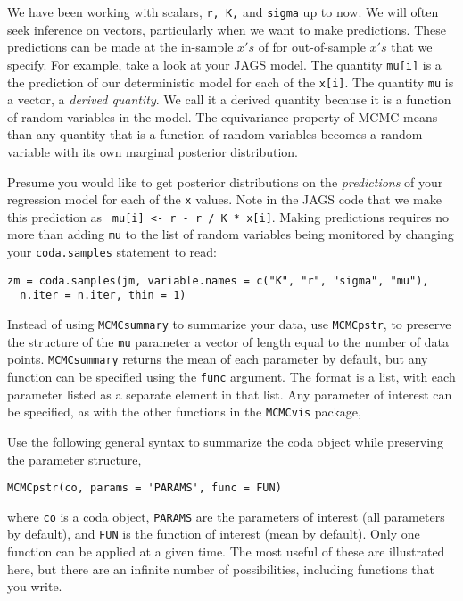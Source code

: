 \documentclass[12pt,english]{article}
\begin{document}
We have been working with scalars, \texttt{r, K,} and \texttt{sigma} up to now.  We will often seek inference on vectors, particularly when we want to make predictions.  These predictions can be made at the in-sample $x's$ of for out-of-sample $x's$ that we specify. For example, take a look at your JAGS model.  The quantity \texttt{mu[i]} is a the prediction of our deterministic model for each of the \texttt{x[i]}.  The quantity \texttt{mu} is a vector, a \emph{derived quantity}.  We call it a derived quantity because it is a function of random variables in the model. The equivariance property of MCMC means than any quantity that is a function of random variables becomes a random variable with its own marginal posterior distribution.

Presume you would like to get posterior distributions on the \emph{predictions} of your regression model for each of the \texttt{x} values. Note in the JAGS code that we make this prediction as \texttt{ mu[i] <- r - r / K * x[i]}. Making predictions requires no more than adding \texttt{mu} to the list of random variables being monitored by changing your \texttt{coda.samples} statement to read:

\begin{Verbatim}
zm = coda.samples(jm, variable.names = c("K", "r", "sigma", "mu"), 
  n.iter = n.iter, thin = 1)
\end{Verbatim}

Instead of using \texttt{MCMCsummary} to summarize your data, use \texttt{MCMCpstr}, to preserve the structure of the \texttt{mu} parameter a vector of length equal to the number of data points. \texttt{MCMCsummary} returns the mean of each parameter by default, but any function can be specified using the \texttt{func} argument. The format is a list, with each parameter listed as a separate element in that list.  Any parameter of interest can be specified, as with the other functions in the \texttt{MCMCvis} package,

Use the following general syntax  to summarize the coda object while preserving the parameter structure,
\begin{Verbatim}
MCMCpstr(co, params = 'PARAMS', func = FUN)
\end{Verbatim}

\noindent where \texttt{co} is a coda object, \texttt{PARAMS} are the parameters of interest (all parameters by default), and \texttt{FUN} is the function of interest (mean by default). Only one function can be applied at a given time. The most useful of these are illustrated here, but there are an infinite number of possibilities, including functions that you write.
\end{document}
